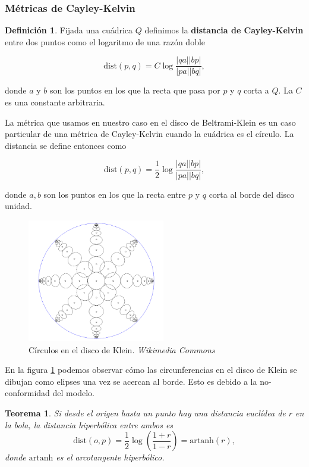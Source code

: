 \documentclass{article}
\theoremstyle{plain}
\newtheorem{theorem}{Teorema}
\theoremstyle{definition}
\newtheorem{definition}{Definición}
\theoremstyle{remark}
\begin{document}
\subsubsection{Métricas de Cayley-Kelvin}
\begin{definition}
  Fijada una cuádrica $Q$ definimos la \textbf{distancia de Cayley-Kelvin}
  entre dos puntos como el logaritmo de una razón doble

  \[
    \mathrm{dist}(p,q) = C\log\frac{|qa||bp|}{|pa||bq|},
  \]

  donde $a$ y $b$ son los puntos en los que la recta que pasa por $p$
  y $q$ corta a $Q$. La $C$ es una constante arbitraria.
\end{definition}

La métrica que usamos en nuestro caso en el disco de Beltrami-Klein es
un caso particular de una métrica de Cayley-Kelvin cuando la cuádrica
es el círculo. La distancia se define entonces como

\[
  \mathrm{dist}(p,q) = \frac{1}{2}\log\frac{|qa||bp|}{|pa||bq|},
\]

donde $a,b$ son los puntos en los que la recta entre $p$ y $q$ corta
al borde del disco unidad.

\begin{figure}[ht!]
  \centering
  \includegraphics[width=60mm]{./kleinmodelcircles.png}
  \caption{Círculos en el disco de Klein. \textit{Wikimedia Commons}\label{kleincircles}}
\end{figure}

En la figura \ref{kleincircles} podemos observar cómo las circunferencias
en el disco de Klein se dibujan como elipses una vez se acercan al borde.
Esto es debido a la no-conformidad del modelo.

\begin{theorem}
  Si desde el origen hasta un punto hay una distancia euclídea de $r$
  en la bola, la distancia hiperbólica entre ambos es
  \[
    \mathrm{dist}(o,p) = \frac{1}{2} \log\left(\frac{1+r}{1-r}\right) = \mathrm{artanh}(r),
  \]
  donde $\mathrm{artanh}$ es el arcotangente hiperbólico.
\end{theorem}
\end{document}
